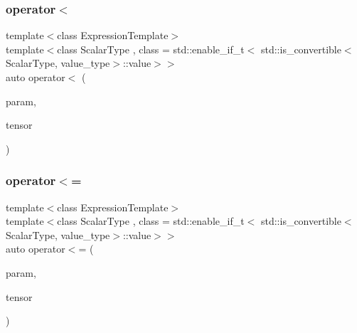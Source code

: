 \mbox{\label{classbc_1_1tensors_1_1Expression__Base_a63cf71d0a07f2a81ac7ae1d1b1d29a83}} 
\subsubsection{\texorpdfstring{operator$<$}{operator<}}
{\footnotesize\ttfamily template$<$class Expression\+Template$>$ \\
template$<$class Scalar\+Type , class  = std\+::enable\+\_\+if\+\_\+t$<$   std\+::is\+\_\+convertible$<$\+Scalar\+Type, value\+\_\+type$>$\+::value$>$$>$ \\
auto operator$<$ (\begin{DoxyParamCaption}\item[{const Scalar\+Type \&}]{param,  }\item[{const \hyperlink{classbc_1_1tensors_1_1Expression__Base}{Expression\+\_\+\+Base}$<$ Expression\+Template $>$ \&}]{tensor }\end{DoxyParamCaption})\hspace{0.3cm}{\ttfamily [friend]}}

\mbox{\label{classbc_1_1tensors_1_1Expression__Base_a44ffee6bfc307f5eb90b79dd2598f196}} 
\subsubsection{\texorpdfstring{operator$<$=}{operator<=}}
{\footnotesize\ttfamily template$<$class Expression\+Template$>$ \\
template$<$class Scalar\+Type , class  = std\+::enable\+\_\+if\+\_\+t$<$   std\+::is\+\_\+convertible$<$\+Scalar\+Type, value\+\_\+type$>$\+::value$>$$>$ \\
auto operator$<$= (\begin{DoxyParamCaption}\item[{const Scalar\+Type \&}]{param,  }\item[{const \hyperlink{classbc_1_1tensors_1_1Expression__Base}{Expression\+\_\+\+Base}$<$ Expression\+Template $>$ \&}]{tensor }\end{DoxyParamCaption})\hspace{0.3cm}{\ttfamily [friend]}}

